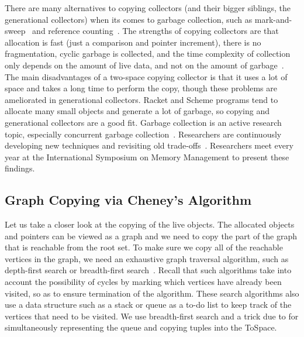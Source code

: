 \documentclass[7x10]{TimesAPriori_MIT}%
\begin{document}
There are many alternatives to copying collectors (and their bigger
siblings, the generational collectors) when its comes to garbage
collection, such as mark-and-sweep~\citep{McCarthy:1960dz} and
reference counting~\citep{Collins:1960aa}.  The strengths of copying
collectors are that allocation is fast (just a comparison and pointer
increment), there is no fragmentation, cyclic garbage is collected,
and the time complexity of collection only depends on the amount of
live data, and not on the amount of garbage~\citep{Wilson:1992fk}. The
main disadvantages of a two-space copying collector is that it uses a
lot of space and takes a long time to perform the copy, though these
problems are ameliorated in generational collectors.  Racket and
Scheme programs tend to allocate many small objects and generate a lot
of garbage, so copying and generational collectors are a good fit.
Garbage collection is an active research topic, especially concurrent
garbage collection~\citep{Tene:2011kx}. Researchers are continuously
developing new techniques and revisiting old
trade-offs~\citep{Blackburn:2004aa,Jones:2011aa,Shahriyar:2013aa,Cutler:2015aa,Shidal:2015aa,Osterlund:2016aa,Jacek:2019aa,Gamari:2020aa}. Researchers
meet every year at the International Symposium on Memory Management to
present these findings.


\subsection{Graph Copying via Cheney's Algorithm}
\label{sec:cheney}
Let us take a closer look at the copying of the live objects. The
allocated objects and pointers can be viewed as a graph and we need to
copy the part of the graph that is reachable from the root set. To
make sure we copy all of the reachable vertices in the graph, we need
an exhaustive graph traversal algorithm, such as depth-first search or
breadth-first search~\citep{Moore:1959aa,Cormen:2001uq}. Recall that
such algorithms take into account the possibility of cycles by marking
which vertices have already been visited, so as to ensure termination
of the algorithm. These search algorithms also use a data structure
such as a stack or queue as a to-do list to keep track of the vertices
that need to be visited. We use breadth-first search and a trick
due to \citet{Cheney:1970aa} for simultaneously representing the queue
and copying tuples into the ToSpace.
\end{document}
